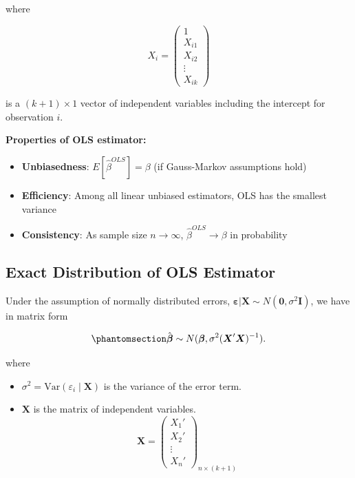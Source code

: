 \documentclass[
  12pt,
]{scrbook}
\providecommand{\tightlist}{%
  \setlength{\itemsep}{0pt}\setlength{\parskip}{0pt}}
\renewcommand{\tightlist}{\setlength{\itemsep}{0.5\baselineskip}\setlength{\parskip}{0.2\baselineskip}}
\newcommand{\bX}{\boldsymbol{X}}
\newcommand{\var}{\mathrm{Var}}
\theoremstyle{plain}
\theoremstyle{definition}
\theoremstyle{remark}
\begin{document}
where

\[
X_i = \begin{pmatrix}1 \\ X_{i1} \\ X_{i2} \\ \vdots \\ X_{ik}\end{pmatrix}
\]

is a \((k+1) \times 1\) vector of independent variables including the
intercept for observation \(i\).

\textbf{Properties of OLS estimator:}

\begin{itemize}
\tightlist
\item
  \textbf{Unbiasedness}: \(E[\hat{\beta}^{OLS}] = \beta\) (if
  Gauss-Markov assumptions hold)
\item
  \textbf{Efficiency}: Among all linear unbiased estimators, OLS has the
  smallest variance
\item
  \textbf{Consistency}: As sample size \(n \to \infty\),
  \(\hat{\beta}^{OLS} \to \beta\) in probability
\end{itemize}

\subsection{Exact Distribution of OLS
Estimator}\label{exact-distribution-of-ols-estimator}

Under the assumption of normally distributed errors,
\(\boldsymbol{\varepsilon} \vert \boldsymbol{X} \sim N(\boldsymbol{0}, \sigma^2\boldsymbol{I})\),
we have in matrix form

\begin{equation}\phantomsection\label{eq-beta-distribution}{
\hat{\boldsymbol{\beta}} \sim N(\boldsymbol{\beta}, \sigma^2 (\boldsymbol{X}'\boldsymbol{X})^{-1}).
}\end{equation}

where

\begin{itemize}
\tightlist
\item
  \(\sigma^2 = \var (\varepsilon_i \mid \bX)\) is the variance of the
  error term.
\item
  \(\bX\) is the matrix of independent variables. \[
  \bX = \begin{pmatrix}
     X_1' \\ X_2' \\ \vdots \\ X_n'
  \end{pmatrix}_{n \times (k+1)}
  \]
\end{itemize}
\end{document}
